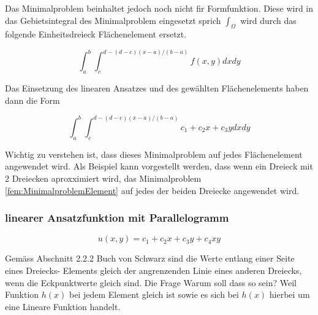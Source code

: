 Das Minimalproblem beinhaltet jedoch noch nicht fir Formfunktion. Diese wird in das Gebietsintegral des Minimalproblem eingesetzt sprich $\int_{\Omega}$ wird durch das folgende Einheitsdreieck Flächenelement ersetzt.

\begin{equation}
\int_a^b \int_c^{d-(d-c)(x-a)/(b-a)} f(x,y) dx dy
\label{fem:FlaecheDreieck}
\end{equation}

Das Einsetzung des linearen Ansatzes und des gewählten Flächenelements haben dann die Form

\begin{equation}
\int_a^b \int_c^{d-(d-c)(x-a)/(b-a)} c_1 + c_2x + c_3y dx dy
\label{fem:MinimalproblemElement}
\end{equation}

Wichtig zu verstehen ist, dass dieses Minimalproblem auf jedes Flächenelement angewendet wird. Als Beispiel kann vorgestellt werden, dass wenn ein Dreieck mit 2 Dreiecken aproxximiert wird, das Minimalproblem \ref{fem:MinimalproblemElement} auf jedes der beiden Dreiecke angewendet wird.

\subsubsection{linearer Ansatzfunktion mit Parallelogramm
\label{fem:subsection:lineParallel}}

\begin{equation}
	u(x,y) = c_1 + c_2 x + c_3 y + c_4 xy
\end{equation} 





Gemäss Abschnitt 2.2.2 Buch von Schwarz sind die Werte entlang einer Seite eines Dreiecks- Elements gleich  der angrenzenden Linie eines anderen Dreiecks, wenn die Eckpunktwerte gleich sind. Die Frage Warum soll dass so sein? Weil Funktion $h(x)$ bei jedem Element gleich ist sowie es sich bei $h(x)$ hierbei um eine Lineare Funktion handelt.

